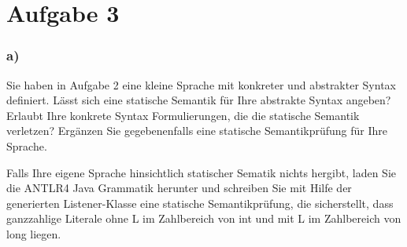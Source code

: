 \chapter{Aufgabe 3}
\label{sec:aufgabe3}

\subsection*{a)}
Sie haben in Aufgabe 2 eine kleine Sprache mit konkreter und abstrakter Syntax definiert.
Lässt sich eine statische Semantik für Ihre abstrakte Syntax angeben?
Erlaubt Ihre konkrete Syntax Formulierungen, die die statische Semantik verletzen?
Ergänzen Sie gegebenenfalls eine statische Semantikprüfung für Ihre Sprache.

Falls Ihre eigene Sprache hinsichtlich statischer Sematik nichts hergibt,
laden Sie die ANTLR4 Java Grammatik herunter und schreiben Sie mit Hilfe der generierten Listener-Klasse eine statische Semantikprüfung,
die sicherstellt, dass ganzzahlige Literale ohne L im Zahlbereich von int und mit L im Zahlbereich von long liegen.

